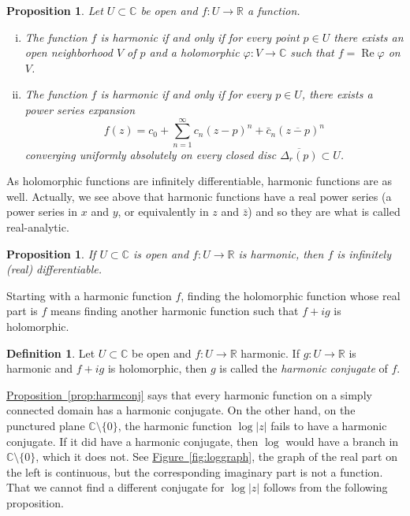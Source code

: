 \documentclass[12pt,openany]{book}
\renewcommand{\Re}{\operatorname{Re}}
\newcommand{\sabs}[1]{\lvert {#1} \rvert}
\newcommand{\C}{{\mathbb{C}}}
\newcommand{\R}{{\mathbb{R}}}
\newcommand{\myindex}[1]{#1\index{#1}}
\theoremstyle{plain}
\newtheorem{prop}[thm]{Proposition}
\theoremstyle{remark}
\theoremstyle{definition}
\newtheorem{defn}[thm]{Definition}
\theoremstyle{exercise}
\theoremstyle{example}
\newcommand{\figureref}[1]{\hyperref[#1]{Figure~\ref*{#1}}}
\newcommand{\propref}[1]{\hyperref[#1]{Proposition~\ref*{#1}}}
\begin{document}
\begin{prop} \label{prop:harmanal}
Let $U \subset \C$ be open and $f \colon U \to \R$ a function.
\begin{enumerate}[(i)]
\item
The function $f$ is harmonic if and only if
for every point $p \in U$ there exists an open neighborhood $V$ of $p$ and a
holomorphic $\varphi \colon V \to \C$ such that $f = \Re \varphi$
on $V$.
\item
The function $f$ is harmonic if and only if
for every $p \in U$, there exists a power series expansion
\begin{equation*}
f(z) =
c_0
+
\sum_{n=1}^\infty c_n {(z-p)}^n + \bar{c}_n {(\overline{z-p})}^n
\end{equation*}
converging uniformly absolutely
on every closed disc $\overline{\Delta_r(p)} \subset U$.
\end{enumerate}
\end{prop}

As holomorphic functions are
infinitely differentiable, harmonic functions are as well.
Actually, we see above that harmonic functions have a real power series
(a power series in $x$ and $y$, or equivalently in $z$ and $\bar{z}$)
and so they are what is called real-analytic.

\begin{prop}
If $U \subset \C$ is open and $f \colon U \to \R$ is harmonic, then $f$ is infinitely (real) differentiable.
\end{prop}

Starting with a harmonic function $f$, finding the holomorphic function whose
real part is $f$ means finding another harmonic function such that $f+ig$ is
holomorphic.

\begin{defn}
Let $U \subset \C$ be open and $f \colon U \to \R$ harmonic.
If $g \colon U \to \R$ is harmonic and $f + i g$ is holomorphic,
then $g$ is called the \emph{\myindex{harmonic conjugate}} of $f$.
\end{defn}

\propref{prop:harmconj}
says that every harmonic function on a simply connected
domain has a harmonic conjugate.  On the other hand, on the punctured plane
$\C \setminus \{ 0 \}$, the harmonic function $\log \sabs{z}$ 
fails to have a harmonic conjugate.  If it did have a harmonic conjugate,
then $\log$ would have a branch in $\C \setminus \{0\}$, which it does not.
See \figureref{fig:loggraph}, the graph of the real part on the left is
continuous, but the corresponding imaginary part is not a function.
That we cannot find a different conjugate for $\log \sabs{z}$
follows from the following proposition.
\end{document}
